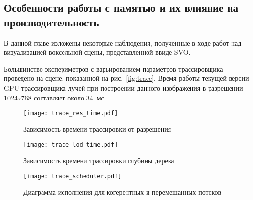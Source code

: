 \subsection{Особенности работы с памятью и их влияние на производительность}

В данной главе изложены некоторые наблюдения, полученные в ходе работ над визуализацией воксельной сцены, представленной ввиде SVO.

Большинство экспериметров с варьированием параметров трассировщика проведено на сцене, показанной на рис.~\ref{fig:trace}. Время работы текущей версии GPU трассировщика лучей при построении данного изображения в разрешении 1024x768 составляет около 34~мс. 

\begin{figure}[h]
\center
\texttt{[image: trace\_res\_time.pdf]}
\caption{Зависимость времени трассировки от разрешения}
\label{fig:trace_res_time}
\end{figure}

\begin{figure}[h]
\center
\texttt{[image: trace\_lod\_time.pdf]}
\caption{Зависимость времени трассировки глубины дерева}
\label{fig:trace_lod_time}
\end{figure}


\begin{figure}[h]
\center
\texttt{[image: trace\_scheduler.pdf]}
\caption{Диаграмма исполнения для когерентных и перемешанных потоков}
\label{fig:trace_scheduler}
\end{figure}
